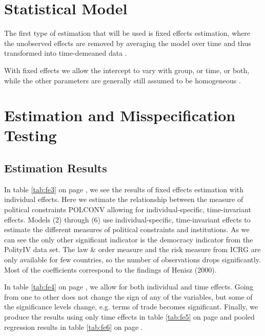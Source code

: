 \documentclass{article}\usepackage{graphicx, color}
\begin{document}
\section{Statistical Model}

The first type of estimation that will be used is fixed effects estimation,
where the unobserved effects are removed by averaging the model over
time and thus transformed into time-demeaned data \citep[pp. 481-2]{wooldridge2009introductory}. 

With fixed effects we allow the intercept to vary with group, or time,
or both, while the other parameters are generally still assumed to
be homogeneous \citep[p. 42]{croissant2008paneldata}.


\section{Estimation and Misspecification Testing}


\subsection{Estimation Results}

In table \ref{tab:fe3} on page \pageref{tab:fe3}, we see the results
of fixed effects estimation with individual effects. Here we estimate
the relationship between the measure of political constraints POLCONV
allowing for individual-specific, time-invariant effects. Models (2)
through (6) use individual-specific, time-invariant effects to estimate
the different measures of political constraints and institutions.
As we can see the only other significant indicator is the democracy
indicator from the PolityIV data set. The law \& order measure and
the risk measure from ICRG are only available for few countries, so
the number of observations drops significantly. Most of the coefficients
correspond to the findings of Henisz (2000).

In table \ref{tab:fe4} on page \pageref{tab:fe4}, we allow for both
individual and time effects. Going from one to other does not change
the sign of any of the variables, but some of the significance levels
change, e.g. terms of trade becomes significant. Finally, we produce
the results using only time effects in table \ref{tab:fe5} on page
\pageref{tab:fe5} and pooled regression results in table \ref{tab:fe6}
on page \pageref{tab:fe6}.
\end{document}
